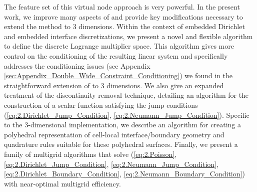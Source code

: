 The feature set of this virtual node approach is very powerful. In the present work, we improve many aspects of \cite{Bedrossian10} and provide key modifications necessary to extend the method to $3$ dimensions. Within the context of embedded Dirichlet and embedded interface discretizations, we present a novel and flexible algorithm to define the discrete Lagrange multiplier space. This algorithm gives more control on the conditioning of the resulting linear system and specifically addresses the conditioning issues (see Appendix \ref{sec:Appendix_Double_Wide_Constraint_Conditioning}) we found in the straightforward extension of \cite{Bedrossian10} to $3$ dimensions. We also give an expanded treatment of the discontinuity removal technique, detailing an algorithm for the construction of a scalar function satisfying the jump conditions (\ref{eq:2.Dirichlet_Jump_Condition}, \ref{eq:2.Neumann_Jump_Condition}). Specific to the $3$-dimensional implementation, we describe an algorithm for creating a polyhedral representation of cell-local interface/boundary geometry and quadrature rules suitable for these polyhedral surfaces. Finally, we present a family of multigrid algorithms that solve (\ref{eq:2.Poisson}, \ref{eq:2.Dirichlet_Jump_Condition}, \ref{eq:2.Neumann_Jump_Condition}, \ref{eq:2.Dirichlet_Boundary_Condition}, \ref{eq:2.Neumann_Boundary_Condition}) with near-optimal multigrid efficiency.

